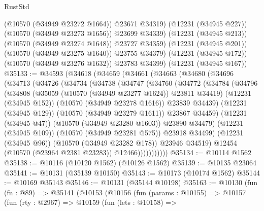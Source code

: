 \begin{lexlean}{RustStd}
\begin{coremodule}
              (@10570 (@34949 @23272 @1664))
              @23671
              @34319)
            (@12231 (@34945 @227))
            (@10570 (@34949 @23273 @1656))
            @23699
            @34339)
          (@12231 (@34945 @213))
          (@10570 (@34949 @23274 @1648))
          @23727
          @34359)
        (@12231 (@34945 @201))
        (@10570 (@34949 @23275 @1640))
        @23755
        @34379)
      (@12231 (@34945 @172))
      (@10570 (@34949 @23276 @1632))
      @23783
      @34399)
    (@12231 (@34945 @167))
@35133 := @34593
    (@34618
      (@34659
        (@34661
          (@34663
            (@34680
              (@34696
                (@34713
                  (@34726
                    (@34734
                      (@34738
                        (@34747
                          (@34760
                            (@34772
                              (@34784
                                (@34796
                                  (@34808
                                    (@35059 (@10570 (@34949 @23277 @1624)) @23811 @34419)
                                    (@12231 (@34945 @152))
                                    (@10570 (@34949 @23278 @1616))
                                    @23839
                                    @34439)
                                  (@12231 (@34945 @129))
                                  (@10570 (@34949 @23279 @1611))
                                  @23867
                                  @34459)
                                (@12231 (@34945 @47))
                                (@10570 (@34949 @23280 @1603))
                                @23890
                                @34479)
                              (@12231 (@34945 @109))
                              (@10570 (@34949 @23281 @575))
                              @23918
                              @34499)
                            (@12231 (@34945 @96))
                            (@10570 (@34949 @23282 @178))
                            @23946
                            @34519)
                          @12454
                          (@10570 (@23964 @2381 @23283))
                          @12466)))))))))))
@35134 := @10114 @1562
@35138 := @10116 (@10120 @1562) (@10126 @1562)
@35139 := @10135 @23064
@35141 := @10131 (@35139 @10150)
@35143 := @10173 (@10174 @1562)
@35144 := @10169 @35143
@35146 := @10131 (@35144 @10198)
@35163 := @10130
    (fun (fn : @89) =>
    @35141
      (@10153
        (@10156
          (fun (params : @10155) =>
          @10157
            (fun (rty : @2967) =>
            @10159
              (fun (lets : @10158) =>

\end{coremodule}
\end{lexlean}
